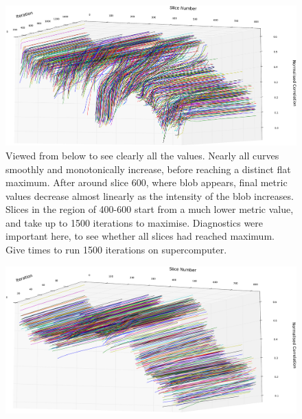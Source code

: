       \begin{figure}
        \centering
        \includegraphics[width=\textheight]{Ch6/Figs/diagnostics/rigid_metric_values}
        \caption{Viewed from below to see clearly all the values. Nearly all curves smoothly and monotonically increase, before reaching a distinct flat maximum. After around slice 600, where blob appears, final metric values decrease almost linearly as the intensity of the blob increases. Slices in the region of 400-600 start from a much lower metric value, and take up to 1500 iterations to maximise. Diagnostics were important here, to see whether all slices had reached maximum. Give times to run 1500 iterations on supercomputer.}
        \label{fig:rigid_metric_values}
      \end{figure}
      
      \begin{figure}
        \centering
        \includegraphics[width=\textheight]{Ch6/Figs/diagnostics/similarity_metric_values}
        \caption{}
        \label{fig:similarity_metric_values}
      \end{figure}
      
